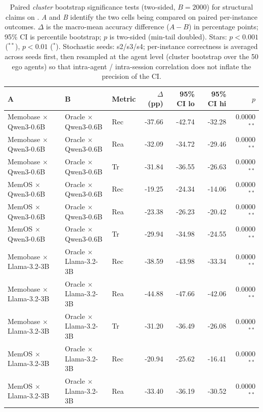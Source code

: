 \begin{table}[h]
\centering
\caption{Paired \emph{cluster} bootstrap significance tests (two-sided, $B=2000$) for structural claims on \benchL{}. \emph{A} and \emph{B} identify the two cells being compared on paired per-instance outcomes. $\Delta$ is the macro-mean accuracy difference ($A-B$) in percentage points; 95\% CI is percentile bootstrap; $p$ is two-sided (min-tail doubled). Stars: $p<0.001$ ($^{**}$), $p<0.01$ ($^{*}$). Stochastic seeds: s2/s3/s4; per-instance correctness is averaged across seeds first, then resampled at the agent level (cluster bootstrap over the 50 ego agents) so that intra-agent / intra-session correlation does not inflate the precision of the CI.}
\label{tab:pvalues}
\footnotesize
\setlength{\tabcolsep}{4pt}
\begin{tabular}{@{}ll l rrr r@{}}
\toprule
\textbf{A} & \textbf{B} & Metric & $\Delta$ (pp) & 95\% CI lo & 95\% CI hi & $p$ \\
\midrule
Memobase $\times$ Qwen3-0.6B & Oracle $\times$ Qwen3-0.6B & Rec & -37.66 & -42.74 & -32.28 & 0.0000$^{**}$ \\
Memobase $\times$ Qwen3-0.6B & Oracle $\times$ Qwen3-0.6B & Rea & -32.09 & -34.72 & -29.46 & 0.0000$^{**}$ \\
Memobase $\times$ Qwen3-0.6B & Oracle $\times$ Qwen3-0.6B & Tr & -31.84 & -36.55 & -26.63 & 0.0000$^{**}$ \\
MemOS $\times$ Qwen3-0.6B & Oracle $\times$ Qwen3-0.6B & Rec & -19.25 & -24.34 & -14.06 & 0.0000$^{**}$ \\
MemOS $\times$ Qwen3-0.6B & Oracle $\times$ Qwen3-0.6B & Rea & -23.38 & -26.23 & -20.42 & 0.0000$^{**}$ \\
MemOS $\times$ Qwen3-0.6B & Oracle $\times$ Qwen3-0.6B & Tr & -29.94 & -34.98 & -24.55 & 0.0000$^{**}$ \\
Memobase $\times$ Llama-3.2-3B & Oracle $\times$ Llama-3.2-3B & Rec & -38.59 & -43.98 & -33.34 & 0.0000$^{**}$ \\
Memobase $\times$ Llama-3.2-3B & Oracle $\times$ Llama-3.2-3B & Rea & -44.88 & -47.66 & -42.06 & 0.0000$^{**}$ \\
Memobase $\times$ Llama-3.2-3B & Oracle $\times$ Llama-3.2-3B & Tr & -31.20 & -36.49 & -26.08 & 0.0000$^{**}$ \\
MemOS $\times$ Llama-3.2-3B & Oracle $\times$ Llama-3.2-3B & Rec & -20.94 & -25.62 & -16.41 & 0.0000$^{**}$ \\
MemOS $\times$ Llama-3.2-3B & Oracle $\times$ Llama-3.2-3B & Rea & -33.40 & -36.19 & -30.52 & 0.0000$^{**}$ \\

\end{tabular}
\end{table}
